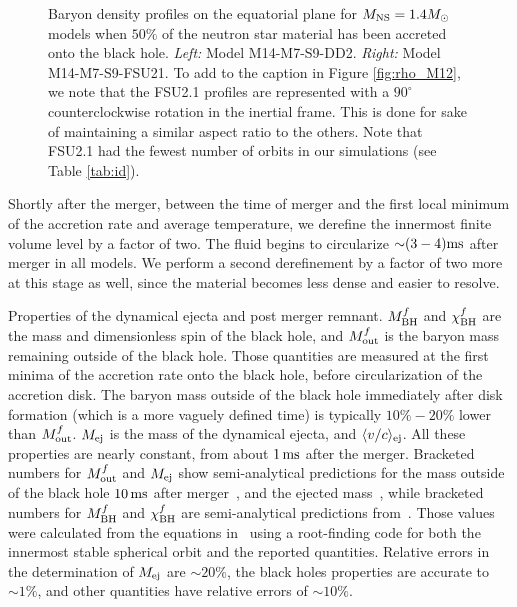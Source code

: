 \begin{figure}
\begin{subfigure}[b]{0.475\textwidth}
		\label{fig:rho_M14_FSU21}
		\centering
	\end{subfigure}
	\caption[Density profiles on equatorial plane for $1.4 M_{\odot}$ models]{
	Baryon density profiles on the equatorial plane for $M_{\rm NS} = 1.4 M_{\odot}$ models when $50\%$ of the neutron star material has been accreted onto the black hole.
	\textit{Left:} Model M14-M7-S9-DD2.
	\textit{Right:} Model M14-M7-S9-FSU21.
	To add to the caption in Figure \ref{fig:rho_M12}, we note that the FSU2.1 profiles are represented with a $90^{\circ}$ counterclockwise rotation in the inertial frame.  This is done for sake of maintaining a similar aspect ratio to the others.  Note that FSU2.1 had the fewest number of orbits in our simulations (see Table \ref{tab:id}). 
	}
	\label{fig:rho_M14}
\end{figure}

Shortly after the merger, between the time of merger and the first local minimum of the accretion rate and average temperature, we derefine the innermost finite volume level by a factor of two.
The fluid begins to circularize $\mathord{\sim} (3-4) {\rm ms}$ after merger in all models.
We perform a second derefinement by a factor of two more at 
this stage as well, since the material becomes less dense and easier to resolve.



\begin{table}
	\begin{center}
		\caption[Properties of the dynamical ejecta and post merger remnant]{
			Properties of the dynamical ejecta and post merger remnant. $M_{\rm BH}^f$ and  $\chi_{\rm BH}^f$  are the mass and dimensionless spin of the black hole,
			and $M_{\rm out}^f$ is the baryon mass remaining outside of the black hole. Those quantities are measured at the first minima of the accretion rate onto the black hole,
			before circularization of the accretion disk. The baryon mass outside of the black hole immediately after disk formation (which is a more vaguely defined
			time) is typically $10\%-20\%$ lower than $M_{\rm out}^f$. $M_{\rm ej}$ is the mass of the dynamical ejecta, and $\langle v/c\rangle_{\rm ej}$. All these properties are nearly constant, from about $1\,{\rm ms}$ after the merger. Bracketed numbers for
			$M_{\rm out}^f$ and $M_{\rm ej}$ show semi-analytical predictions for the mass outside of the black hole $10\,{\rm ms}$ after merger~\cite{Foucart2012},
			and the ejected mass~\cite{Kawaguchi:2016}, while bracketed numbers for $M_{\rm BH}^f$ and $\chi_{\rm BH}^f$ are semi-analytical predictions
			from~\cite{Pannarale:2014}. Those values were calculated from the equations in~\cite{Pannarale:2014} using a root-finding code for both the innermost stable spherical orbit and the reported quantities.  Relative errors in the determination of $M_{\rm ej}$ are $\sim 20\%$, the black holes properties are
			accurate to $\sim 1\%$, and other quantities have relative errors of $\sim 10\%$.
		}
		\label{tab:results}
		{
			
		}
	\end{center}
\end{table}



